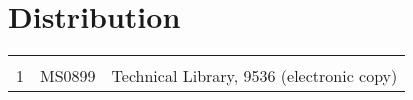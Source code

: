 \ifsand
{}
\pagestyle{fancy}
\newpage
{}
\section*{Distribution}
\begin{tabular}[t]{lll}
  & & \\

1 & MS0899 & Technical Library, 9536 (electronic copy)
\end{tabular}
\fi

\fancyhead{}
\cleardoublepage
